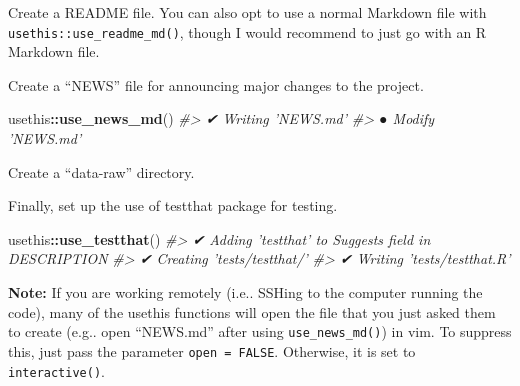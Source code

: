 \documentclass[]{book}
\newenvironment{Shaded}{\begin{snugshade}}{\end{snugshade}}
\newcommand{\CommentTok}[1]{\textcolor[rgb]{0.56,0.35,0.01}{\textit{#1}}}
\newcommand{\KeywordTok}[1]{\textcolor[rgb]{0.13,0.29,0.53}{\textbf{#1}}}
\newcommand{\NormalTok}[1]{#1}
\newcommand{\OperatorTok}[1]{\textcolor[rgb]{0.81,0.36,0.00}{\textbf{#1}}}
\begin{document}
Create a README file. You can also opt to use a normal Markdown file with \texttt{usethis::use\_readme\_md()}, though I would recommend to just go with an R Markdown file.

\begin{Shaded}
\end{Shaded}

Create a ``NEWS'' file for announcing major changes to the project.

\begin{Shaded}
\begin{Highlighting}[]
\NormalTok{usethis}\OperatorTok{::}\KeywordTok{use_news_md}\NormalTok{()}
\CommentTok{#> ✔ Writing 'NEWS.md'}
\CommentTok{#> ● Modify 'NEWS.md'}
\end{Highlighting}
\end{Shaded}

Create a ``data-raw'' directory.

\begin{Shaded}
\end{Shaded}

Finally, set up the use of testthat package for testing.

\begin{Shaded}
\begin{Highlighting}[]
\NormalTok{usethis}\OperatorTok{::}\KeywordTok{use_testthat}\NormalTok{()}
\CommentTok{#> ✔ Adding 'testthat' to Suggests field in DESCRIPTION}
\CommentTok{#> ✔ Creating 'tests/testthat/'}
\CommentTok{#> ✔ Writing 'tests/testthat.R'}
\end{Highlighting}
\end{Shaded}

\textbf{Note:} If you are working remotely (i.e.. SSHing to the computer running the code), many of the usethis functions will open the file that you just asked them to create (e.g.. open ``NEWS.md'' after using \texttt{use\_news\_md()}) in vim. To suppress this, just pass the parameter \texttt{open\ =\ FALSE}. Otherwise, it is set to \texttt{interactive()}.
\end{document}
